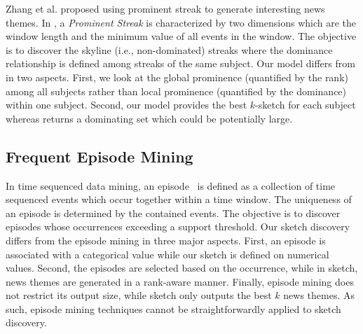 Zhang et al.\cite{zhang2014discovering} proposed using prominent streak to generate interesting news themes.
In \cite{zhang2014discovering}, a \emph{Prominent Streak} is characterized by two dimensions which are the window length and the minimum value of all events in the window. The objective is to discover the skyline (i.e., non-dominated)
streaks where the dominance relationship is defined among streaks of the same subject. Our model differs from \cite{zhang2014discovering} in two aspects. First, we look at the global prominence (quantified by the rank) among all subjects rather than local prominence (quantified by the dominance) within one subject. Second, our model provides the best $k$-sketch for each subject whereas \cite{zhang2014discovering} returns a dominating set which could be potentially large. 
 
\subsection{Frequent Episode Mining}
In time sequenced data mining, an episode~\cite{mannila1997discepisodes,
zhou2010serialepisodes, tatti2012strictepisodes, laxman2007nonoverlapepisodes} is 
defined as a collection of time sequenced events which occur together within a time window. The uniqueness of an episode is determined by the contained events. The objective is to discover episodes whose 
occurrences exceeding a support threshold. 
Our sketch discovery differs from the episode mining in three major aspects. First, an episode is associated with a categorical value while our sketch is defined on numerical values. Second, the episodes are selected based on the occurrence, while in sketch, news themes are generated in a rank-aware manner. Finally, episode mining does not restrict its output size, while sketch only outputs the best $k$ news themes. As such, episode mining techniques cannot be straightforwardly applied to sketch discovery.



